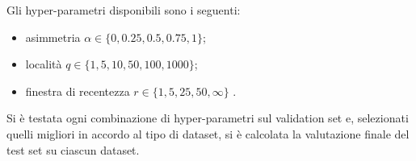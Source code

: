 Gli hyper-parametri disponibili sono i seguenti:
\begin{itemize}
    \item asimmetria $\alpha \in \{0, 0.25, 0.5, 0.75, 1\}$;
    \item località $q \in \{1, 5, 10, 50, 100, 1000\}$;
    \item finestra di recentezza $r \in \{1, 5, 25, 50, \infty \}$ .
\end{itemize}

Si è testata ogni combinazione di hyper-parametri sul validation set e, selezionati quelli migliori in accordo al tipo di dataset, si è calcolata la valutazione finale del test set su ciascun dataset.